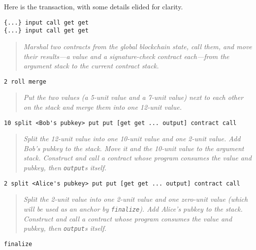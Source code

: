 \documentclass{article}
\newenvironment{example}{
  \medskip\begin{adjustwidth}{.25in}{}\footnotesize
}{
  \normalsize\end{adjustwidth}
}
\newenvironment{commentary}{\begin{quote}\itshape}{\normalfont\end{quote}}
\begin{document}
Here is the transaction, with some details elided for clarity.

\begin{example}

\begin{verbatim}
{...} input call get get
{...} input call get get
\end{verbatim}

\begin{commentary}
Marshal two contracts from the global blockchain state, call them, and
move their results---a value and a signature-check contract
each---from the argument stack to the current contract stack.
\end{commentary}

\begin{verbatim}
2 roll merge
\end{verbatim}

\begin{commentary}
Put the two values (a 5-unit value and a 7-unit value) next to each
other on the stack and merge them into one 12-unit value.
\end{commentary}


\begin{verbatim}
10 split <Bob's pubkey> put put [get get ... output] contract call
\end{verbatim}

\begin{commentary}
Split the 12-unit value into one 10-unit value and one 2-unit
value. Add Bob's pubkey to the stack. Move it and the 10-unit value to
the argument stack. Construct and call a contract whose program
consumes the value and pubkey, then {\normalfont\texttt{output}}s
itself.
\end{commentary}

\begin{verbatim}
2 split <Alice's pubkey> put put [get get ... output] contract call
\end{verbatim}

\begin{commentary}
Split the 2-unit value into one 2-unit value and one zero-unit value
(which will be used as an anchor by
{\normalfont\texttt{finalize}}). Add Alice's pubkey to the stack.
Construct and call a contract whose program consumes the value and
pubkey, then {\normalfont\texttt{output}}s itself.
\end{commentary}

\begin{verbatim}
finalize
\end{verbatim}


\end{example}
\end{document}
